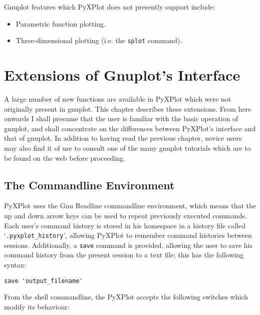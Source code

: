 \documentclass[a4paper,onecolumn,11pt]{book}
\begin{document}
Gnuplot features which PyXPlot does not presently support include:

\begin{itemize}
\item Parametric function plotting.
\item Three-dimensional plotting (i.e. the \texttt{splot} command).
\end{itemize}

\chapter{Extensions of Gnuplot's Interface}
\label{new_features}

A large number of new functions are available in PyXPlot which were not
originally present in gnuplot. This chapter describes these extensions.  From
here onwards I shall presume that the user is familiar with the basic operation
of gnuplot, and shall concentrate on the differences between PyXPlot's
interface and that of gnuplot. In addition to having read the previous chapter,
novice users may also find it of use to consult one of the many gnuplot
tutorials which are to be found on the web before proceeding.

\section{The Commandline Environment}

PyXPlot uses the Gnu Readline commandline environment, which means that the up
and down arrow keys can be used to repeat previously executed commands. Each
user's command history is stored in his homespace in a history file called
`\texttt{.pyxplot\_history}', allowing PyXPlot to remember command histories
between sessions. Additionally, a \texttt{save} command is provided, allowing
the user to save his command history from the present session to a text file;
this has the following syntax:

\begin{verbatim}
save 'output_filename'
\end{verbatim}

From the shell commandline, the PyXPlot accepts the following switches which
modify its behaviour:
\end{document}
